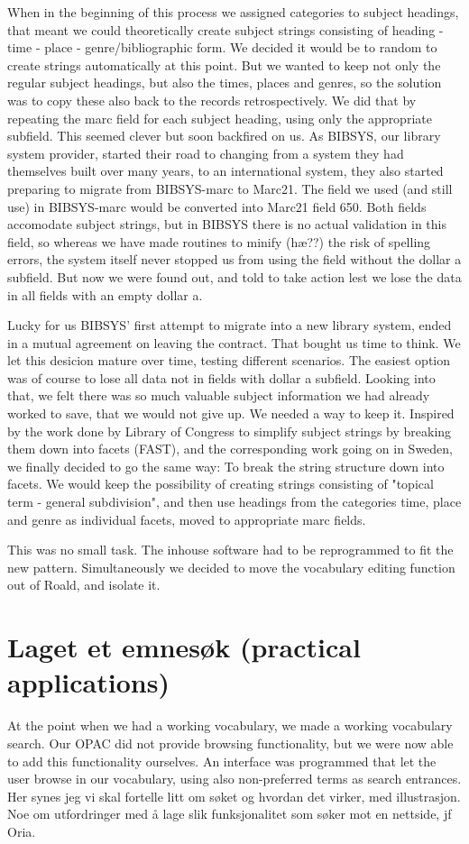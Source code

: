 When in the beginning of this process we assigned categories to subject headings, that meant we could theoretically create subject strings consisting of heading - time - place - genre/bibliographic form. We decided it would be to random to create strings automatically at this point. But we wanted to keep not only the regular subject headings, but also the times, places and genres, so the solution was to copy these also back to the records retrospectively. We did that by repeating the marc field for each subject heading, using only the appropriate subfield. This seemed clever but soon backfired on us. As BIBSYS, our library system provider, started their road to changing from a system they had themselves built over many years, to an international system, they also started preparing to migrate from BIBSYS-marc to Marc21. The field we used (and still use) in BIBSYS-marc would be converted into Marc21 field 650. Both fields accomodate subject strings, but in BIBSYS there is no actual validation in this field, so whereas we have made routines to minify (hæ??) the risk of spelling errors, the system itself never stopped us from using the field without the dollar a subfield. But now we were found out, and told to take action lest we lose the data in all fields with an empty dollar a. 

Lucky for us BIBSYS' first attempt to migrate into a new library system, ended in a mutual agreement on leaving the contract. That bought us time to think. We let this desicion mature over time, testing different scenarios. The easiest option was of course to lose all data not in fields with dollar a subfield. Looking into that, we felt there was so much valuable subject information we had already worked to save, that we would not give up. We needed a way to keep it. Inspired by the work done by Library of Congress to simplify subject strings by breaking them down into facets (FAST), and the corresponding work going on in Sweden, we finally decided to go the same way: To break the string structure down into facets. We would keep the possibility of creating strings consisting of "topical term - general subdivision", and then use headings from the categories time, place and genre as individual facets, moved to appropriate marc fields. 

This was no small task. The inhouse software had to be reprogrammed to fit the new pattern. Simultaneously we decided to move the vocabulary editing function out of Roald, and isolate it. 

\section{Laget et emnesøk (practical applications)}
At the point when we had a working vocabulary, we made a working vocabulary search. Our OPAC did not provide browsing functionality, but we were now able to add this functionality ourselves. An interface was programmed that let the user browse in our vocabulary, using also non-preferred terms as search entrances. Her synes jeg vi skal fortelle litt om søket og hvordan det virker, med illustrasjon. Noe om utfordringer med å lage slik funksjonalitet som søker mot en nettside, jf Oria. 

